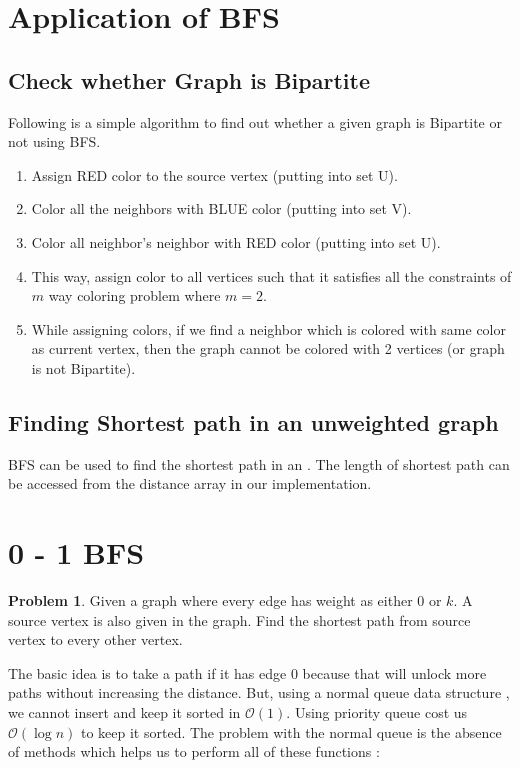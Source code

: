 \documentclass[twoside,12pt,a4paper,english]{book}
\theoremstyle{definition}
\theoremstyle{problemstyle}
\newtheorem*{problem}{Problem} %
\begin{document}
\section{Application of BFS}

\subsection{Check whether Graph is Bipartite}

Following is a simple algorithm to find out whether a given graph is Bipartite or not using BFS.

\begin{enumerate}
    \item Assign RED color to the source vertex (putting into set U).
    \item Color all the neighbors with BLUE color (putting into set V).
    \item Color all neighbor’s neighbor with RED color (putting into set U).
    \item This way, assign color to all vertices such that it satisfies all the constraints of $m$ way coloring problem where $m = 2$.
    \item While assigning colors, if we find a neighbor which is colored with same color as current vertex, then the graph cannot be colored with 2 vertices (or graph is not Bipartite).
\end{enumerate}

\subsection{Finding Shortest path in an unweighted graph}

BFS can be used to find the shortest path in an . The length of shortest path can be accessed from the distance array in our implementation.

\section{0 - 1 BFS}

\begin{problem}
  Given a graph where every edge has weight as either $0$ or $k$. A source vertex is also given in the graph. Find the shortest path from source vertex to every other vertex.
\end{problem}

The basic idea is to take a path if it has edge 0 because that will unlock more paths without increasing the distance. But, using a normal queue data structure , we cannot insert and keep it sorted in $\mathcal{O}(1)$. Using priority queue cost us $\mathcal{O}(\log{n})$ to keep it sorted. The problem with the normal queue is the absence of methods which helps us to perform all of these functions :
\end{document}
